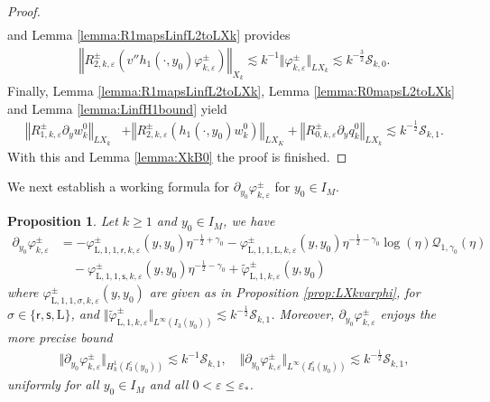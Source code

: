 \documentclass[11pt,reqno]{amsproc}
\newtheorem{proposition}{Proposition}[section]
\theoremstyle{definition}
\numberwithin{equation}{section}
\newcommand{\rL}{{\mathrm{L}}}
\newcommand{\Q}{{\mathcal{Q}}}
\newcommand{\sr}{{\mathsf{r}}}
\newcommand{\s}{{\mathsf{s}}}
\newcommand{\cS}{{\mathcal S}}
\newcommand{\ep}{\varepsilon}
\begin{document}
\begin{proof}
\begin{align*}
\end{align*}
and Lemma \ref{lemma:R1mapsLinfL2toLXk} provides
\begin{align*}
\left\Vert R_{2,k,\ep}^\pm \left(v'' h_1(\cdot,y_0)\varphi_{k,\ep}^\pm \right)  \right\Vert_{X_k}\lesssim k^{-1}\Vert \varphi_{k,\ep}^\pm \Vert_{LX_k}\lesssim k^{-\frac32}\cS_{k,0}.
\end{align*}
Finally, Lemma \ref{lemma:R1mapsLinfL2toLXk}, Lemma \ref{lemma:R0mapsL2toLXk} and Lemma \ref{lemma:LinfH1bound} yield
\begin{align*}
\left\Vert R_{1,k,\ep}^\pm \partial_y w_k^0 \right\Vert_{LX_k} &+ \left\Vert R_{2,k,\ep}^\pm \left(h_1(\cdot,y_0) w_k^0\right) \right \Vert_{LX_K} + \left\Vert R_{0,k,\ep}^\pm \partial_y q_k^0 \right\Vert_{LX_k} \lesssim k^{-\frac12}\cS_{k,1}.
\end{align*}
With this and Lemma \ref{lemma:XkB0} the proof is finished.
\end{proof}

We next establish a working formula for $\partial_{y_0}\varphi_{k,\ep}^\pm$ for $y_0\in I_M$.

\begin{proposition}\label{prop:LXkpynotvarphi}
Let $k\geq 1$ and $y_0\in I_M$, we have
\begin{equation}\label{eq:decomLXkpynotvarphi}
\begin{split}
\partial_{y_0}\varphi_{k,\ep}^\pm &= -\varphi_{\rL,1,1,\sr,k,\ep}^\pm(y,y_0) \eta^{-\frac12+\gamma_0} - \varphi_{\rL,1,1,\rL,k,\ep}^\pm(y,y_0) \eta^{-\frac12-\gamma_0}\log(\eta) \Q_{1,\gamma_0}(\eta) \\
&\quad -\varphi_{\rL,1,1,\s,k,\ep}^\pm(y,y_0) \eta^{-\frac12-\gamma_0} + \widetilde\varphi_{\rL,1,k,\ep}^\pm(y,y_0)
\end{split}
\end{equation}
where $\varphi_{\rL,1,1,\sigma,k,\ep}^\pm(y,y_0)$ are given as in Proposition \ref{prop:LXkvarphi}, for $\sigma\in \lbrace \sr, \s, \rL \rbrace$, and $\Vert \widetilde\varphi_{\rL,1,k,\ep}^\pm \Vert_{L^\infty(I_3(y_0))} \lesssim  k^{-\frac12}\cS_{k,1}$. Moreover, $\partial_{y_0}\varphi_{k,\ep}^\pm$ enjoys the more precise bound
\begin{align*}
\Vert \partial_{y_0}\varphi_{k,\ep}^\pm \Vert_{H_k^1(I_3^c(y_0))} \lesssim  k^{-1}\cS_{k,1}, \quad \Vert \partial_{y_0}\varphi_{k,\ep}^\pm \Vert_{L^\infty(I_3^c(y_0))} \lesssim k^{-\frac12}\cS_{k,1}, 
\end{align*}
uniformly for all $y_0\in I_M$ and all $0 < \ep\leq \ep_*$.
\end{proposition}
\end{document}

